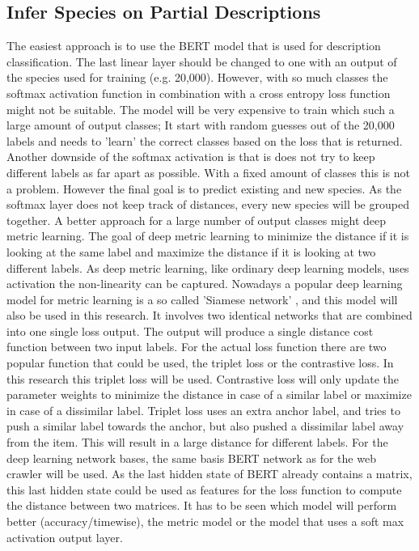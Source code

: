 \documentclass{article}
\begin{document}
\subsection{Infer Species on Partial Descriptions}
The easiest approach is to use the BERT model that is used for description classification.
The last linear layer should be changed to one with an output of the species used for training (e.g. 20,000).
However, with so much classes the softmax activation function in combination with a cross entropy loss function might not be suitable.
The model will be very expensive to train which such a large amount of output classes; It start with random guesses out of the 20,000 labels and needs to 'learn' the correct classes based on the loss that is returned.
Another downside of the softmax activation is that is does not try to keep different labels as far apart as possible.
With a fixed amount of classes this is not a problem.
However the final goal is to predict existing and new species.
As the softmax layer does not keep track of distances, every new species will be grouped together.
A better approach for a large number of output classes might deep metric learning.
The goal of deep metric learning to minimize the distance if it is looking at the same label and maximize the distance if it is looking at two different labels.
As deep metric learning, like ordinary deep learning models, uses activation the non-linearity can be captured.
Nowadays a popular deep learning model for metric learning is a so called 'Siamese network' \cite{kaya_deep_2019}, and this model will also be used in this research.
It involves two identical networks that are combined into one single loss output.
The output will produce a single distance cost function between two input labels.
For the actual loss function there are two popular function that could be used, the triplet loss or the contrastive loss.
In this research this triplet loss \cite{schroff_facenet_2015} will be used.
Contrastive loss will only update the parameter weights to minimize the distance in case of a similar label or maximize in case of a dissimilar label.
Triplet loss uses an extra anchor label, and tries to push a similar label towards the anchor, but also pushed a dissimilar label away from the item.
This will result in a large distance for different labels.
For the deep learning network bases, the same basis BERT network as for the web crawler will be used.
As the last hidden state of BERT already contains a matrix, this last hidden state could be used as features for the loss function to compute the distance between two matrices.
It has to be seen which model will perform better (accuracy/timewise), the metric model or the model that uses a soft max activation output layer.
\end{document}
